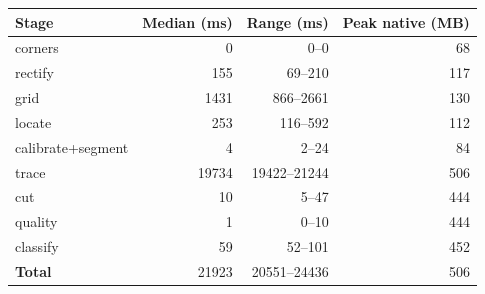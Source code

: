 \begin{tabular}{@{}lrrr@{}}
\toprule
\textbf{Stage} & \textbf{Median (ms)} & \textbf{Range (ms)} & \textbf{Peak native (MB)}\\
\midrule
corners & 0 & 0--0 & 68\\
rectify & 155 & 69--210 & 117\\
grid & 1431 & 866--2661 & 130\\
locate & 253 & 116--592 & 112\\
calibrate+segment & 4 & 2--24 & 84\\
trace & 19734 & 19422--21244 & 506\\
cut & 10 & 5--47 & 444\\
quality & 1 & 0--10 & 444\\
classify & 59 & 52--101 & 452\\
\midrule
\textbf{Total} & 21923 & 20551--24436 & 506\\
\bottomrule
\end{tabular}
